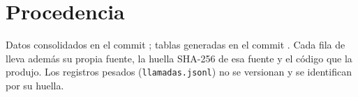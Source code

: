 \documentclass[11pt]{article}
\theoremstyle{remark}
\begin{document}
\appendix
\section{Procedencia}\label{ap:procedencia}
\sloppy

Datos consolidados en el commit \texttt{\CommitDatos}; tablas generadas en el commit \texttt{\CommitTablas}. Cada fila de  lleva además su propia fuente, la huella SHA-256 de esa fuente y el código que la produjo. Los registros pesados (\texttt{llamadas.jsonl}) no se versionan y se identifican por su huella.

{\scriptsize\setlength{\tabcolsep}{3pt}

}
\end{document}
